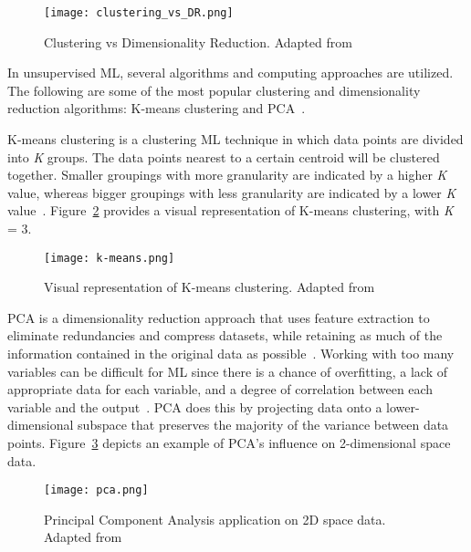     \begin{figure}[htbp]
        \centering
        \texttt{[image: clustering\_vs\_DR.png]}
        \caption{Clustering vs Dimensionality Reduction. Adapted from~\cite{Beck2020AModelling}}
        \label{fig:clustering_vs_DR}
    \end{figure}

In unsupervised \gls{ML}, several algorithms and computing approaches are utilized. The following are some of the most popular clustering and dimensionality reduction algorithms: K-means clustering and \gls{PCA}~\cite{Chugh2018TypesKnow}.

K-means clustering is a clustering \gls{ML} technique in which data points are divided into \textit{K} groups. The data points nearest to a certain centroid will be clustered together. Smaller groupings with more granularity are indicated by a higher \textit{K} value, whereas bigger groupings with less granularity are indicated by a lower \textit{K} value~\cite{2020WhatIBMb}. Figure~\ref{fig:k_means} provides a visual representation of K-means clustering, with \textit{K} = 3. 
    
\begin{figure}[htbp]
    \centering
    \texttt{[image: k-means.png]}
    \caption{Visual representation of K-means clustering. Adapted from~\cite{Beaumont2020ImageMedium}}
    \label{fig:k_means}
\end{figure}

\gls{PCA} is a dimensionality reduction approach that uses feature extraction to eliminate redundancies and compress datasets, while retaining as much of the information contained in the original data as possible~\cite{2020WhatIBMb}. Working with too many variables can be difficult for \gls{ML} since there is a chance of overfitting, a lack of appropriate data for each variable, and a degree of correlation between each variable and the output~\cite{Chugh2018TypesKnow}. \gls{PCA} does this by projecting data onto a lower-dimensional subspace that preserves the majority of the variance between data points. Figure~\ref{fig:pca} depicts an example of \gls{PCA}'s influence on 2-dimensional space data.

\begin{figure}[htbp]
    \centering
    \texttt{[image: pca.png]}
    \caption{Principal Component Analysis application on 2D space data. Adapted from~\cite{Patcher2014WhatDNA}}
    \label{fig:pca}
\end{figure}

